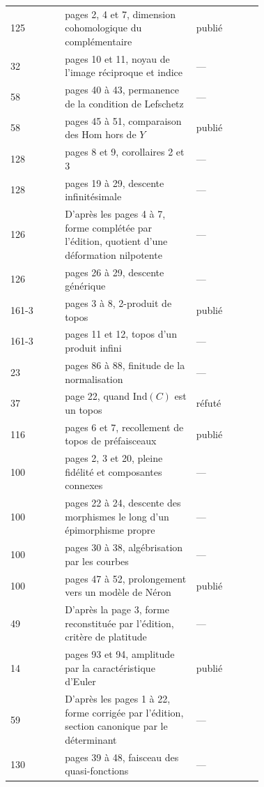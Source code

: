 {\begin{longtable}{@{}l>{\raggedright\arraybackslash}p{0.52\linewidth}>{\raggedright\arraybackslash}p{0.2\linewidth}r@{}}
125 & pages 2, 4 et 7, dimension cohomologique du complémentaire & publié & \pageref{nv:18}\\
32 & pages 10 et 11, noyau de l'image réciproque et indice & --- & \pageref{nv:19}\\
58 & pages 40 à 43, permanence de la condition de Lefschetz & --- & \pageref{nv:20}\\
58 & pages 45 à 51, comparaison des Hom hors de $Y$ & publié & \pageref{nv:21}\\
128 & pages 8 et 9, corollaires 2 et 3 & --- & \pageref{nv:22}\\
128 & pages 19 à 29, descente infinitésimale & --- & \pageref{nv:23}\\
126 & D'après les pages 4 à 7, forme complétée par l'édition, quotient d'une déformation nilpotente & --- & \pageref{nv:24}\\
126 & pages 26 à 29, descente générique & --- & \pageref{nv:25}\\
161-3 & pages 3 à 8, 2-produit de topos & publié & \pageref{nv:26}\\
161-3 & pages 11 et 12, topos d'un produit infini & --- & \pageref{nv:27}\\
23 & pages 86 à 88, finitude de la normalisation & --- & \pageref{nv:28}\\
37 & page 22, quand $\mathrm{Ind}(C)$ est un topos & réfuté & \pageref{nv:29}\\
116 & pages 6 et 7, recollement de topos de préfaisceaux & publié & \pageref{nv:30}\\
100 & pages 2, 3 et 20, pleine fidélité et composantes connexes & --- & \pageref{nv:31}\\
100 & pages 22 à 24, descente des morphismes le long d'un épimorphisme propre & --- & \pageref{nv:32}\\
100 & pages 30 à 38, algébrisation par les courbes & --- & \pageref{nv:33}\\
100 & pages 47 à 52, prolongement vers un modèle de Néron & publié & \pageref{nv:34}\\
49 & D'après la page 3, forme reconstituée par l'édition, critère de platitude & --- & \pageref{nv:35}\\
14 & pages 93 et 94, amplitude par la caractéristique d'Euler & publié & \pageref{nv:36}\\
59 & D'après les pages 1 à 22, forme corrigée par l'édition, section canonique par le déterminant & --- & \pageref{nv:37}\\
130 & pages 39 à 48, faisceau des quasi-fonctions & --- & \pageref{nv:38}\\

\end{longtable}}
